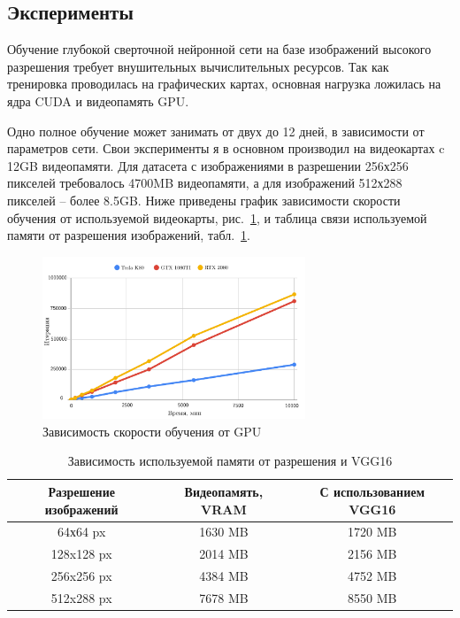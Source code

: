 \documentclass[11pt,a4paper]{extarticle}
\begin{document}
{			
	\subsection{Эксперименты}\label{sec:tests}

		Обучение глубокой сверточной нейронной сети на базе изображений высокого разрешения требует внушительных вычислительных ресурсов.
		Так как тренировка проводилась на графических картах, основная нагрузка ложилась на ядра CUDA и видеопамять GPU.
		
		Одно полное обучение может занимать от двух до 12 дней, в зависимости от параметров сети.
		Свои эксперименты я в основном производил на видеокартах c 12GB видеопамяти.
		Для датасета с изображениями в разрешении 256х256 пикселей требовалось 4700MB видеопамяти, а для изображений 512х288 пикселей -- более 8.5GB.
		Ниже приведены график зависимости скорости обучения от используемой видеокарты, рис.~\ref{pic:gpu_power}, и таблица связи используемой памяти от разрешения изображений, табл.~\ref{tab:memory}.

		\begin{figure}[ht]
			\centering
			\includegraphics[width=0.7\textwidth]{img/gpu_power}
			\caption{Зависимость скорости обучения от GPU}
			\label{pic:gpu_power}
		\end{figure}

		\begin{table}[ht]
			\centering
			\begin{tabular}{|c|c|c|}
				\hline
				\rowcolor[HTML]{EFEFEF}
				\textbf{Разрешение изображений} & \textbf{Видеопамять, VRAM} & \textbf{С использованием VGG16} \\ \hline
				64х64 px                        & 1630 MB                         & 1720 MB                       \\ \hline
				128x128 px                      & 2014 MB                         & 2156 MB                       \\ \hline
				256x256 px                      & 4384 MB                         & 4752 MB                       \\ \hline
				512x288 px                      & 7678 MB                         & 8550 MB                       \\ \hline
			\end{tabular}
			\caption{Зависимость используемой памяти от разрешения и VGG16}
			\label{tab:memory}
		\end{table}			
		
}
\end{document}
